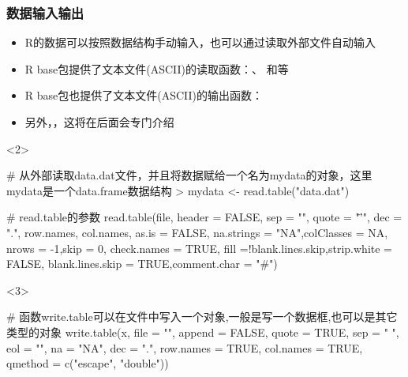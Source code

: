 \subsubsection{数据输入输出}
\begin{frame}[t,fragile]{\subsecname}{\subsubsecname}
\begin{itemize}
\item<1-> R的数据可以按照数据结构手动输入，也可以通过读取外部文件自动输入
\item<2-> R base包提供了文本文件(ASCII)的读取函数：、
                     和等
\item<3-> R base包也提供了文本文件(ASCII)的输出函数：
\item<4-> 另外，，这将在后面会专门介绍
\end{itemize}

\begin{overlayarea}{\textwidth}{\textheight}
\begin{onlyenv}<2>
\begin{rcode}
# 从外部读取data.dat文件，并且将数据赋给一个名为mydata的对象，这里mydata是一个data.frame数据结构
> mydata <- read.table("data.dat")

# read.table的参数
read.table(file, header = FALSE, sep = "", quote = "\"’", dec = ".", row.names, col.names, as.is = FALSE, na.strings = "NA",colClasses = NA, nrows = -1,skip = 0, check.names = TRUE, fill =!blank.lines.skip,strip.white = FALSE, blank.lines.skip = TRUE,comment.char = "#")
\end{rcode}
\end{onlyenv}

\begin{onlyenv}<3>
\begin{rcode}
# 函数write.table可以在文件中写入一个对象,一般是写一个数据框,也可以是其它类型的对象
write.table(x, file = "", append = FALSE, quote = TRUE, sep = " ", eol = "\n", na = "NA", dec = ".", row.names = TRUE, col.names = TRUE, qmethod = c("escape", "double"))
\end{rcode}
\end{onlyenv}
\end{overlayarea}
\end{frame}

